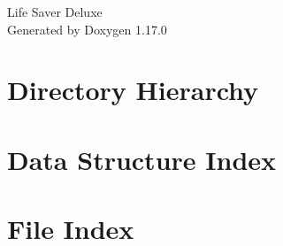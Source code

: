 \documentclass[twoside]{book}
\newcommand{\+}{\discretionary{\mbox{\scriptsize$\hookleftarrow$}}{}{}}
\newcommand{\clearemptydoublepage}{%
    \newpage{\pagestyle{empty}\cleardoublepage}%
  }
\begin{document}
  \raggedbottom
    \hypersetup{pageanchor=false,
                bookmarksnumbered=true,
                pdfencoding=unicode
               }
  \begin{titlepage}
  \vspace*{7cm}
  \begin{center}%
  {\Large Life Saver Deluxe}\\
  \vspace*{1cm}
  {\large Generated by Doxygen 1.17.0}\\
  \end{center}
  \end{titlepage}
  \clearemptydoublepage
  \tableofcontents
  \clearemptydoublepage
  \hypersetup{pageanchor=true}




\chapter{Directory Hierarchy}

\chapter{Data Structure Index}

\chapter{File Index}

\end{document}
